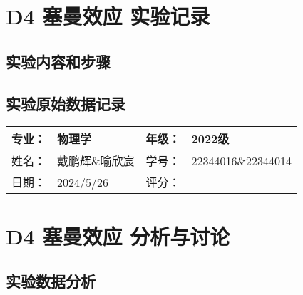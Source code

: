 \documentclass[dvipsnames, svgnames,a4paper,11pt]{article}
\begin{document}
\section{D4 \quad 塞曼效应 \quad\heiti 实验记录}
\subsection{实验内容和步骤}





\clearpage

\subsection{实验原始数据记录}








	





\clearpage
\begin{table}
	\renewcommand\arraystretch{1.7}
	\begin{tabularx}{\textwidth}{|X|X|X|X|}
	\hline
	专业：& 物理学 &年级：& 2022级\\
	\hline
	姓名： & 戴鹏辉\&喻欣宸 & 学号：& 22344016\&22344014\\
	\hline
    日期：& 2024/5/26 & 评分： &\\
	\hline
	\end{tabularx}
\end{table}

\section{D4 \quad 塞曼效应 \quad\heiti 分析与讨论}

\subsection{实验数据分析}
\end{document}
